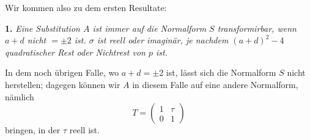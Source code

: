 \documentclass[12pt,a4paper]{article}
\begin{document}
\newpage
{}

Wir kommen also zu dem ersten Resultate:

\medskip\noindent
\textbf{1.} \emph{Eine Substitution $A$ ist immer auf die Normalform $S$ transformirbar, wenn $a + d$ nicht $= \pm 2$ ist. $\sigma$ ist reell oder imaginär, je nachdem $(a + d)^{2} - 4$ quadratischer Rest oder Nichtrest von $p$ ist.}

In dem noch übrigen Falle, wo $a + d = \pm 2$ ist, lässt sich die Normalform $S$ nicht herstellen; dagegen können wir $A$ in diesem Falle auf eine andere Normalform, nämlich
\begin{equation}\label{eq:68.5}
\tag{5}
T = \begin{pmatrix}1&\tau\\0&1\end{pmatrix}
\end{equation}
bringen, in der $\tau$ reell ist.
\end{document}
